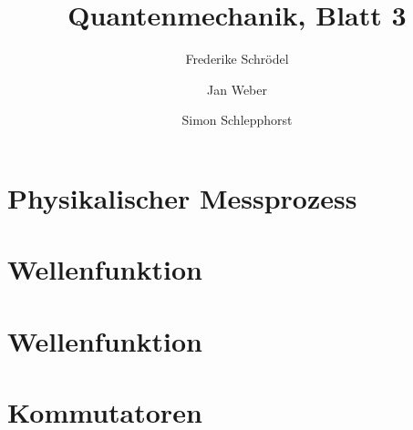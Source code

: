 \documentclass[11pt, ngerman, fleqn, DIV=15, headinclude]{scrartcl}
\title{Quantenmechanik, Blatt 3}
\author{
    Frederike Schrödel \and Jan Weber \and Simon Schlepphorst
}
\begin{document}
\maketitle

\section{Physikalischer Messprozess}



\section{Wellenfunktion}

\section{Wellenfunktion}

\section{Kommutatoren}
\end{document}
